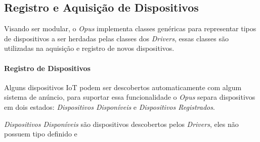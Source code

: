 \subsection{Registro e Aquisição de Dispositivos}
Visando ser modular, o \emph{Opus} implementa classes genéricas para representar tipos de dispositivos a ser herdadas pelas 
classes dos \emph{Drivers}, essas classes são utilizadas na aquisição e registro de novos dispositivos.

\paragraph{Registro de Dispositivos}
Alguns dispositivos IoT podem ser descobertos automaticamente com algum sistema de anúncio, para suportar essa funcionalidade
o \emph{Opus} separa dispositivos em dois estados: \emph{Dispositivos Disponíveis} e \emph{Dispositivos Registrados}.

\emph{Dispositivos Disponíveis} são dispositivos descobertos pelos \emph{Drivers}, eles não possuem tipo definido e 